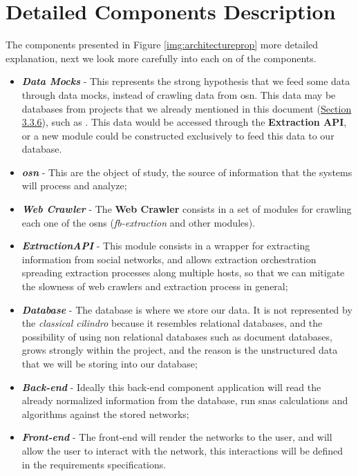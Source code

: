 \section{Detailed Components Description}
The components presented in Figure \ref{img:architectureprop} more detailed explanation, next we look more carefully into each on of the components.
\begin{itemize}
    \item \textbf{\textit{Data Mocks}} - This represents the strong hypothesis that we feed some data through data mocks, instead of crawling data from \gls{osn}. This data may be databases from projects that we already mentioned in this document  (\hyperref[sec:otherdatasources]{Section 3.3.6}), such as \cite{kunegis2013konect}. This data would be accessed through the \textbf{Extraction API}, or a new module could be constructed exclusively to feed this data to our database.
    \item \textbf{\textit{\acrfull{osn}}} - This are the object of study, the source of information that the systems will process and analyze;
    \item \textbf{\textit{Web Crawler}} - The \textbf{Web Crawler} consists in a set of modules for crawling each one of the \glspl{osn} (\textit{fb-extraction} and other modules).
    \item \textbf{\textit{ExtractionAPI}} - This module consists in a wrapper for extracting information from social networks, and allows extraction orchestration spreading extraction processes along multiple hosts, so that we can mitigate the slowness of web crawlers and extraction process in general;
    \item \textbf{\textit{Database}} - The database is where we store our data. It is not represented by the \textit{classical cilindro} because it resembles relational databases, and the possibility of using non relational databases such as document databases, grows strongly within the project, and the reason is the unstructured data that we will be storing into our database;
    \item \textbf{\textit{Back-end}} - Ideally this back-end component application will read the already normalized information from the database, run \glspl{sna} calculations and algorithms against the stored networks;
    \item \textbf{\textit{Front-end}} - The front-end will render the networks to the user, and will allow the user to interact with the network, this interactions will be defined in the requirements specifications.
\end{itemize}
